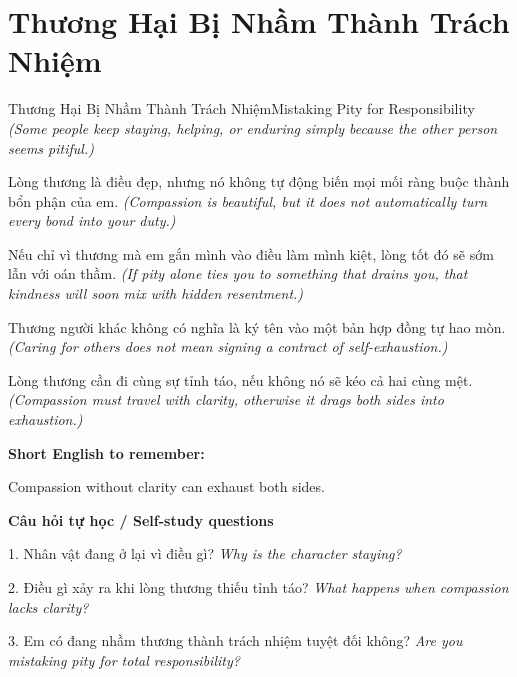 \section{Thương Hại Bị Nhầm Thành Trách Nhiệm}
\begin{truyen}{Thương Hại Bị Nhầm Thành Trách Nhiệm}{Mistaking Pity for Responsibility}
\textit{(Some people keep staying, helping, or enduring simply because the other person seems pitiful.)}

Lòng thương là điều đẹp, nhưng nó không tự động biến mọi mối ràng buộc thành bổn phận của em.
\textit{(Compassion is beautiful, but it does not automatically turn every bond into your duty.)}

Nếu chỉ vì thương mà em gắn mình vào điều làm mình kiệt, lòng tốt đó sẽ sớm lẫn với oán thầm.
\textit{(If pity alone ties you to something that drains you, that kindness will soon mix with hidden resentment.)}

Thương người khác không có nghĩa là ký tên vào một bản hợp đồng tự hao mòn.
\textit{(Caring for others does not mean signing a contract of self-exhaustion.)}

\end{truyen}

\begin{baihoc}
Lòng thương cần đi cùng sự tỉnh táo, nếu không nó sẽ kéo cả hai cùng mệt.
\textit{(Compassion must travel with clarity, otherwise it drags both sides into exhaustion.)}
\end{baihoc}

\begin{ghinhoanh}
\textbf{Short English to remember:}

Compassion without clarity can exhaust both sides.

\end{ghinhoanh}

\begin{tuhocnhanh}
\textbf{Câu hỏi tự học / Self-study questions}

1. Nhân vật đang ở lại vì điều gì? \textit{Why is the character staying?}

2. Điều gì xảy ra khi lòng thương thiếu tỉnh táo? \textit{What happens when compassion lacks clarity?}

3. Em có đang nhầm thương thành trách nhiệm tuyệt đối không? \textit{Are you mistaking pity for total responsibility?}
\end{tuhocnhanh}
\ngancach

